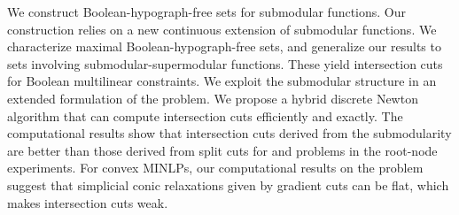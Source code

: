 We construct Boolean-hypograph-free sets for  submodular functions. Our construction relies on a new continuous extension of submodular functions. We characterize maximal Boolean-hypograph-free sets, and generalize our results to sets involving submodular-supermodular functions. These yield intersection cuts for Boolean multilinear constraints. We exploit the submodular structure in an extended formulation of the \dopt problem. We propose a hybrid discrete Newton algorithm that can compute intersection cuts efficiently and exactly. The computational results show that intersection cuts derived from the submodularity are better than those derived from  split cuts for \maxcut and \pbm problems in the root-node experiments. For convex MINLPs, our computational results on the \bdopt problem suggest that  simplicial conic relaxations given by  gradient cuts can be flat, which makes intersection cuts weak.






